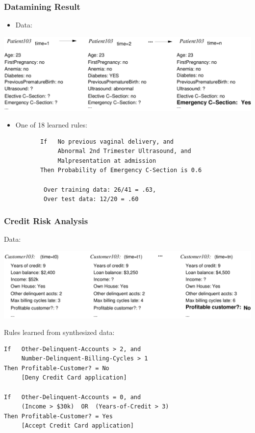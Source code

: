 \documentclass{beamer}
\begin{document}
\begin{frame}[fragile]
\frametitle{Datamining Result}
\label{sec-2-3}


\begin{itemize}
\item Data:
\end{itemize}

\includegraphics[width=.9\linewidth]{./image/csec.png}

\begin{itemize}
\item One of 18 learned rules:
       \begin{verbatim}
       If   No previous vaginal delivery, and
            Abnormal 2nd Trimester Ultrasound, and
            Malpresentation at admission
       Then Probability of Emergency C-Section is 0.6

        Over training data: 26/41 = .63,
        Over test data: 12/20 = .60
       \end{verbatim}
\end{itemize}
\end{frame}
\begin{frame}[fragile]
\frametitle{Credit Risk Analysis}
\label{sec-2-4}

Data:

\includegraphics[width=.9\linewidth]{./image/credit-outcomes.png}

Rules learned from synthesized data:
\begin{verbatim}
If   Other-Delinquent-Accounts > 2, and
     Number-Delinquent-Billing-Cycles > 1
Then Profitable-Customer? = No
     [Deny Credit Card application]

If   Other-Delinquent-Accounts = 0, and
     (Income > $30k)  OR  (Years-of-Credit > 3)
Then Profitable-Customer? = Yes
     [Accept Credit Card application]
\end{verbatim}
\end{frame}
\end{document}
